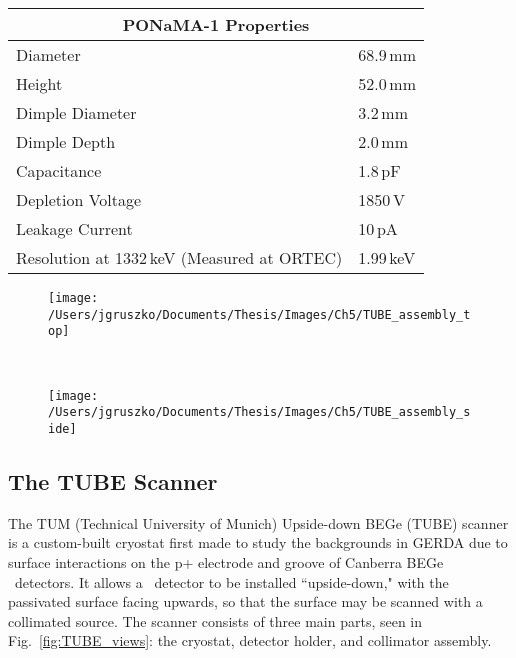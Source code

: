 \begin{table}[]
\centering
\begin{tabular}{p{5cm} | l}
\hline
\multicolumn{2}{c}{PONaMA-1 Properties} \\
\hline
Diameter & 68.9\,mm \\ 
Height & 52.0\,mm \\ 
Dimple Diameter & 3.2\,mm \\
Dimple Depth & 2.0\,mm \\
Capacitance & 1.8\,pF \\
Depletion Voltage & 1850\,V \\
Leakage Current & 10\,pA \\
Resolution at 1332\,keV \newline (Measured at ORTEC) & 1.99\,keV \\
\end{tabular}
 \label{tab:PONaMA_specs}
\end{table}

\begin{figure*}[p]
 \centering
  \begin{subfigure}[]{\textwidth}
  \centering
 \texttt{[image: /Users/jgruszko/Documents/Thesis/Images/Ch5/TUBE\_assembly\_top]}
 \label{fig:TUBE_top}
\end{subfigure}
  ~
  \begin{subfigure}[]{\textwidth}
   \centering
 \texttt{[image: /Users/jgruszko/Documents/Thesis/Images/Ch5/TUBE\_assembly\_side]}
 \label{fig:TUBE_side}
 \end{subfigure}
\caption[A diagram of the TUBE scanner]{Simplified top {\it (top)} and bisected views {\it (bottom)} of the TUBE scanner, showing key dimensions. The thermal braids connecting the IR umbrella to the IR cup and the mylar covering of the IR umbrella are not shown. Details of the detector cup, front-end electronics, and cold-finger are also removed for clarity.}
\label{fig:TUBE_views}
\end{figure*}

\subsection{The TUBE Scanner}
The TUM (Technical University of Munich) Upside-down BEGe (TUBE) scanner is a custom-built cryostat first made to study the backgrounds in GERDA due to surface interactions on the p+ electrode and groove of Canberra BEGe \ppc\ detectors. It allows a \ppc\ detector to be installed ``upside-down," with the passivated surface facing upwards, so that the surface may be scanned with a collimated source. The scanner consists of three main parts, seen in Fig.~\ref{fig:TUBE_views}: the cryostat, detector holder, and collimator assembly. 

